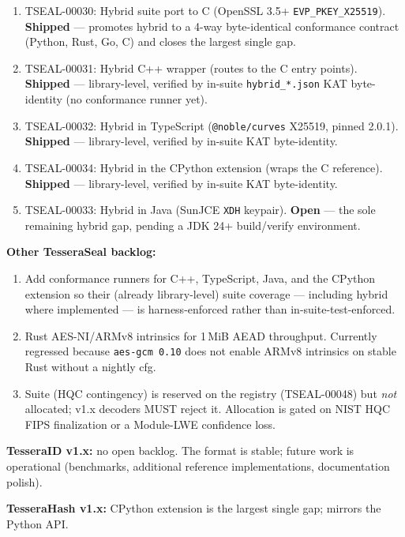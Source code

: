 \begin{enumerate}
\item TSEAL-00030: Hybrid suite  port to C (OpenSSL 3.5+ \texttt{EVP\_PKEY\_X25519}). \textbf{Shipped} --- promotes hybrid to a 4-way byte-identical conformance contract (Python, Rust, Go, C) and closes the largest single gap.
\item TSEAL-00031: Hybrid  C++ wrapper (routes to the C entry points). \textbf{Shipped} --- library-level, verified by in-suite \texttt{hybrid\_*.json} KAT byte-identity (no \tesseraseal{} conformance runner yet).
\item TSEAL-00032: Hybrid  in TypeScript (\texttt{@noble/curves} X25519, pinned 2.0.1). \textbf{Shipped} --- library-level, verified by in-suite KAT byte-identity.
\item TSEAL-00034: Hybrid  in the CPython extension (wraps the C reference). \textbf{Shipped} --- library-level, verified by in-suite KAT byte-identity.
\item TSEAL-00033: Hybrid  in Java (SunJCE \texttt{XDH} keypair). \textbf{Open} --- the sole remaining hybrid gap, pending a JDK 24+ build/verify environment.
\end{enumerate}

\textbf{Other TesseraSeal backlog:}

\begin{enumerate}
\item Add \tesseraseal{} conformance runners for C++, TypeScript, Java, and the CPython extension so their (already library-level) suite coverage --- including hybrid  where implemented --- is harness-enforced rather than in-suite-test-enforced.
\item Rust AES-NI/ARMv8 intrinsics for 1\,MiB AEAD throughput. Currently regressed because \texttt{aes-gcm 0.10} does not enable ARMv8 intrinsics on stable Rust without a nightly cfg.
\item Suite  (HQC contingency) is reserved on the registry (TSEAL-00048) but \emph{not} allocated; v1.x decoders MUST reject it. Allocation is gated on NIST HQC FIPS finalization or a Module-LWE confidence loss.
\end{enumerate}

\textbf{TesseraID v1.x:} no open backlog. The format is stable; future work is operational (benchmarks, additional reference implementations, documentation polish).

\textbf{TesseraHash v1.x:} CPython extension is the largest single gap; mirrors the Python API.

